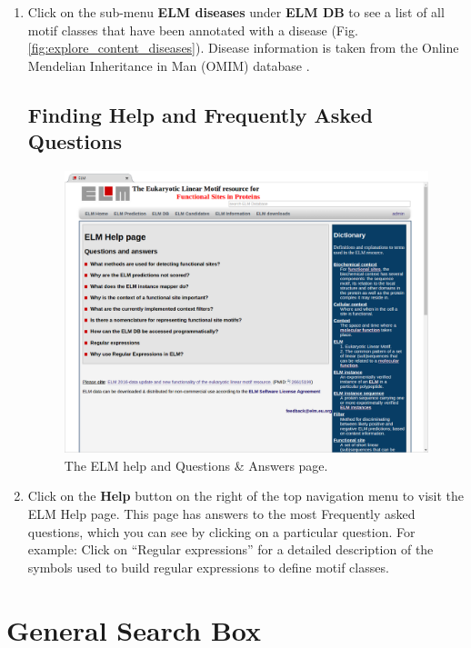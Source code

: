 \documentclass[12pt]{article}
\newcommand\button[1]{%
	\textbf{#1}%
}
\begin{document}
\begin{enumerate}
\item Click on the sub-menu \button{ELM diseases} under \button{ELM DB} to see
	a list of all motif classes that have been annotated with a disease
	(Fig. \ref{fig:explore_content_diseases}). Disease information is taken
	from the Online Mendelian Inheritance in Man (OMIM) database
	\cite{17357067}.

%
%
\subsection*{Finding Help and Frequently Asked Questions}
\label{subsec:explore_content_help}

\begin{figure}[h!]
	\centering
	\includegraphics[width=\textwidth]{Figures/explore_content/help.png} 
	\caption{
		The ELM help and Questions \& Answers page.
	}
	\label{fig:explore_content_viruses}
\end{figure}

\item Click on the \button{Help} button on the right of the top navigation menu
	to visit the ELM Help page. This page has answers to the most
	Frequently asked questions, which you can see by clicking on a
	particular question. For example: Click on ``Regular expressions'' for
	a detailed description of the symbols used to build regular expressions
	to define motif classes.
\end{enumerate}


\section{General Search Box}
\label{sec:general_search}
\end{document}
